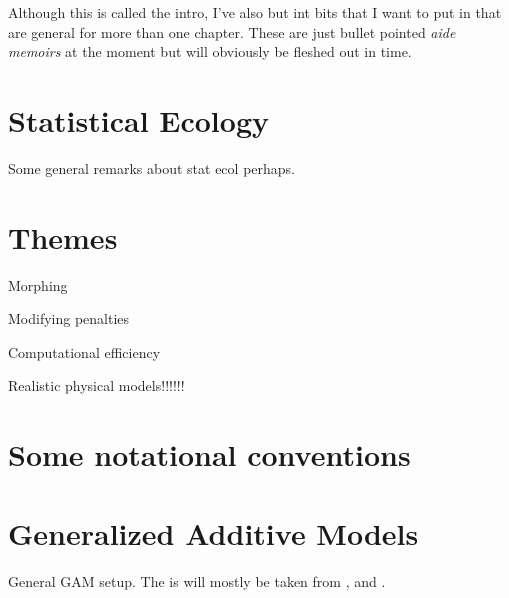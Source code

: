 Although this is called the intro, I've also but int bits that I want to put in that are general for more than one chapter. These are just bullet pointed \emph{aide memoirs} at the moment but will obviously be fleshed out in time.

\section{Statistical Ecology}

Some general remarks about stat ecol perhaps.

\section{Themes}

\bi
	\item Morphing
	\item Modifying penalties
	\item Computational efficiency
	\item Realistic physical models!!!!!!
\ei


\section{Some notational conventions}



\section{Generalized Additive Models}

General GAM setup. The is will mostly be taken from \cite{simonbook}, \cite{rwc} and \cite{marraradice2010}.

